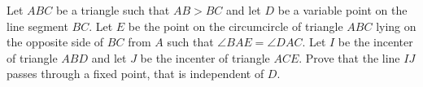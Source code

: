 Let $ABC$ be a triangle such that $AB>BC$ and let $D$ be a variable point on the line segment $BC$. Let $E$ be the point on the circumcircle of triangle $ABC$ lying on the opposite side of $BC$ from $A$ such that $\angle{BAE}=\angle{DAC}$. Let $I$ be the incenter of triangle $ABD$ and let $J$ be the incenter of triangle $ACE$. Prove that the line $IJ$ passes through a fixed point, that is independent of $D$.
